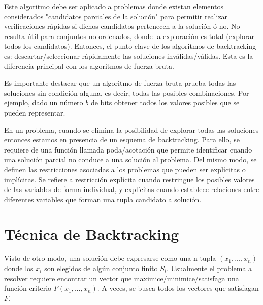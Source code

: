 Este algoritmo debe ser aplicado a problemas donde existan elementos considerados "candidatos parciales de la solución" para permitir realizar verificaciones rápidas si dichos candidatos pertenecen a la solución ó no. No resulta útil para conjuntos no ordenados, donde la exploración es total (explorar todos los candidatos). Entonces, el punto clave de los algoritmos de backtracking es: descartar/seleccionar rápidamente las soluciones inválidas/válidas. Esta es la diferencia principal con los algoritmos de fuerza bruta.

Es importante destacar que un algoritmo de fuerza bruta prueba todas las soluciones sin condición alguna, es decir, todas las posibles combinaciones. Por ejemplo, dado un número $b$ de bits obtener todos los valores posibles que se pueden representar.

En un problema, cuando se elimina la posibilidad de explorar todas las soluciones entonces estamos en presencia de un esquema de backtracking. Para ello, se requiere de una función llamada poda/acotación que permite identificar cuando una solución parcial no conduce a una solución al problema. Del mismo modo, se definen las restricciones asociadas a los problemas que pueden ser explícitas o implícitas. Se refiere a restricción explícita cuando restringue los posibles valores de las variables de forma individual, y explícitas cuando establece relaciones entre diferentes variables que forman una tupla candidato a solución.

\section{Técnica de Backtracking}

Visto de otro modo, una solución debe expresarse como una n-tupla $(x_1, ..., x_n)$ donde los $x_i$ son elegidos de algún conjunto finito $S_i$. Usualmente el problema a resolver requiere encontrar un vector que maximice/minimice/satisfaga una función criterio $F(x_1,...,x_n)$. A veces, se busca todos los vectores que satisfagan $F$. 

